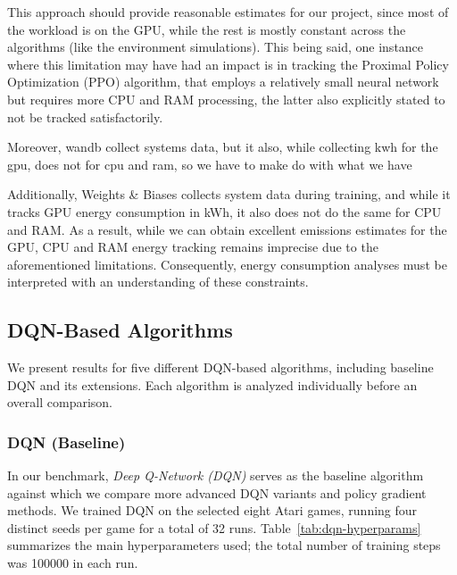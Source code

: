 This approach should provide reasonable estimates for our project, since most of the workload is on the GPU, while the rest is mostly constant across the algorithms (like the environment simulations). This being said, one instance where this limitation may have had an impact is in tracking the Proximal Policy Optimization (PPO) algorithm, that employs a relatively small neural network but requires more CPU and RAM processing, the latter also explicitly stated to not be tracked satisfactorily.

Moreover, wandb collect systems data, but it also, while collecting kwh for the gpu, does not for cpu and ram, so we have to make do with what we have

Additionally, Weights \& Biases collects system data during training, and while it tracks GPU energy consumption in kWh, it also does not do the same for CPU and RAM. As a result, while we can obtain excellent emissions estimates for the GPU, CPU and RAM energy tracking remains imprecise due to the aforementioned limitations. Consequently, energy consumption analyses must be interpreted with an understanding of these constraints.

\subsection{DQN-Based Algorithms}
We present results for five different DQN-based algorithms, including baseline DQN and its extensions. Each algorithm is analyzed individually before an overall comparison.

\subsubsection{DQN (Baseline)}
\label{subsubsec:dqn}

In our benchmark, \emph{Deep Q-Network (DQN)} serves as the baseline algorithm against which we compare more advanced DQN variants and policy gradient methods. We trained DQN on the selected eight Atari games, running four distinct seeds per game for a total of 32 runs. Table~\ref{tab:dqn-hyperparams} summarizes the main hyperparameters used; the total number of training steps was \num{100000} in each run.

